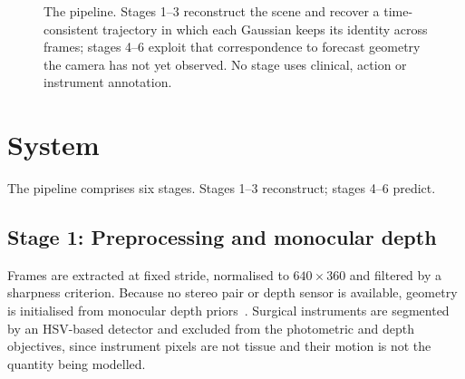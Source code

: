 \documentclass[conference]{IEEEtran}
\begin{document}
\begin{figure}[t]
\centering
{}
\caption{The pipeline. Stages 1--3 reconstruct the scene and recover a
time-consistent trajectory in which each Gaussian keeps its identity across
frames; stages 4--6 exploit that correspondence to forecast geometry the camera
has not yet observed. No stage uses clinical, action or instrument annotation.}
\label{fig:pipeline}
\end{figure}

\section{System}
\label{sec:system}

The pipeline comprises six stages. Stages 1--3 reconstruct; stages 4--6 predict.

\subsection{Stage 1: Preprocessing and monocular depth}
Frames are extracted at fixed stride, normalised to $640\times360$ and filtered by
a sharpness criterion. Because no stereo pair or depth sensor is available,
geometry is initialised from monocular depth
priors~\cite{yang2024depthanythingv2}. Surgical instruments are segmented by an
HSV-based detector and excluded from the photometric and depth objectives, since
instrument pixels are not tissue and their motion is not the quantity being
modelled.
\end{document}
